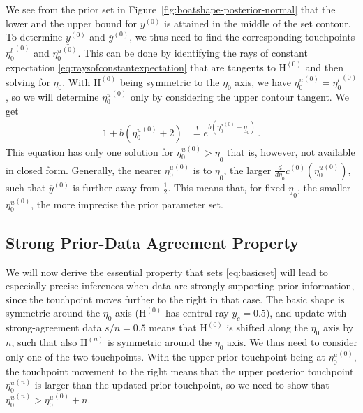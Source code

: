 \documentclass[runningheads,a4paper]{llncs}
\newcommand{\uz}{^{(0)}} %
\newcommand{\un}{^{(n)}} %
\newcommand{\ul}[1]{\underline{#1}}
\newcommand{\ol}[1]{\overline{#1}}
\def\yz{y\uz}
\def\yzl{\ul{y}\uz}
\def\yzu{\ol{y}\uz}
\def\EZ{\mathrm{H}\uz}
\def\EN{\mathrm{H}\un}
\newcommand{\ez}{\eta_0}
\def\ezl{\ul{\eta}_0}
\def\czu{\ol{c}\uz}
\begin{document}
We see from the prior set in Figure~\ref{fig:boatshape-posterior-normal}
that the lower and the upper bound for $\yz$
is attained in the middle of the set contour.
To determine $\yzl$ and $\yzu$, we thus need to find the corresponding
touchpoints ${\eta_0^l}\uz$ and ${\eta_0^u}\uz$.
This can be done by identifying the rays of constant expectation \eqref{eq:raysofconstantexpectation}
that are tangents to $\EZ$ and then solving for $\eta_0$.
With $\EZ$ being symmetric to the $\eta_0$ axis, we have ${\eta_0^u}\uz = {\eta_0^l}\uz$,
so we will determine ${\eta_0^u}\uz$ only by considering the upper contour tangent.
We get
\begin{align}
1 + b({\eta_0^u}\uz + 2) &\stackrel{!}{=} e^{b({\eta_0^u}\uz - \ezl)}\,.
\label{eq:eta0uprior}
\end{align}
This equation has only one solution for ${\eta_0^u}\uz > \ezl$
that is, however, not available in closed form.
Generally, the nearer ${\eta_0^u}\uz$ is to $\ezl$, the larger $\frac{d}{d\eta_0} \czu({\eta_0^u}\uz)$,
such that $\yzu$ %
is further away from $\frac{1}{2}$.
This means that, for fixed $\ezl$, the smaller ${\eta_0^u}\uz$, the more imprecise the prior parameter set.


\subsection{Strong Prior-Data Agreement Property}
\label{sec:spda-property}

We will now derive the essential property that sets \eqref{eq:basicset}
will lead to especially precise inferences when data are strongly supporting prior information,
since the touchpoint moves further to the right in that case. %
The basic shape is symmetric around the $\ez$ axis ($\EZ$ has central ray $y_c = 0.5$),
and update with strong-agreement data $s/n = 0.5$ means that $\EZ$ is shifted along the $\ez$ axis by $n$,
such that also $\EN$ is symmetric around the $\ez$ axis.
We thus need to consider only one of the two touchpoints.
With the upper prior touchpoint being at ${\eta_0^u}\uz$,
the touchpoint movement to the right means that the upper posterior touchpoint ${\eta_0^u}\un$
is larger than the updated prior touchpoint,
so we need to show that ${\eta_0^u}\un > {\eta_0^u}\uz + n$.
\end{document}
